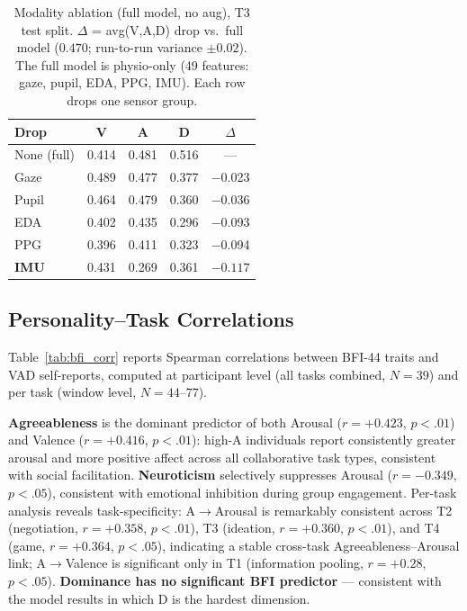 \documentclass[sigconf,review,anonymous]{acmart}
\begin{document}
\begin{table}[t]
\caption{Modality ablation (full model, no aug), T3 test split.
  $\Delta$ = avg(V,A,D) drop vs.\ full model ($0.470$; run-to-run variance
  $\pm 0.02$). The full model is physio-only (49 features: gaze, pupil,
  EDA, PPG, IMU). Each row drops one sensor group.}
\label{tab:ablation}
\centering
\begin{tabular}{lccc|c}
\toprule
\textbf{Drop} & \textbf{V} & \textbf{A} & \textbf{D} & $\Delta$ \\
\midrule
None (full)     & 0.414 & 0.481 & 0.516 &  ---   \\
Gaze            & 0.489 & 0.477 & 0.377 & $-$0.023 \\
Pupil           & 0.464 & 0.479 & 0.360 & $-$0.036 \\
EDA             & 0.402 & 0.435 & 0.296 & $-$0.093 \\
PPG             & 0.396 & 0.411 & 0.323 & $-$0.094 \\
\textbf{IMU}    & 0.431 & 0.269 & 0.361 & $\mathbf{-0.117}$ \\
\bottomrule
\end{tabular}
\end{table}

\subsection{Personality--Task Correlations}

Table~\ref{tab:bfi_corr} reports Spearman correlations between BFI-44 traits
and VAD self-reports, computed at participant level (all tasks combined,
$N = 39$) and per task (window level, $N = 44$--$77$).

\textbf{Agreeableness} is the dominant predictor of both Arousal
($r = {+}0.423$, $p < .01$) and Valence ($r = {+}0.416$, $p < .01$):
high-A individuals report consistently greater arousal and more positive
affect across all collaborative task types, consistent with social
facilitation.
\textbf{Neuroticism} selectively suppresses Arousal ($r = {-}0.349$,
$p < .05$), consistent with emotional inhibition during group engagement.
Per-task analysis reveals task-specificity: A$\to$Arousal is remarkably
consistent across T2 (negotiation, $r = {+}0.358$, $p{<}.01$),
T3 (ideation, $r = {+}0.360$, $p{<}.01$), and T4 (game, $r = {+}0.364$,
$p{<}.05$), indicating a stable cross-task Agreeableness--Arousal link;
A$\to$Valence is significant only in T1 (information pooling, $r = {+}0.28$,
$p{<}.05$).
\textbf{Dominance has no significant BFI predictor} --- consistent with
the model results in which D is the hardest dimension.
\end{document}
